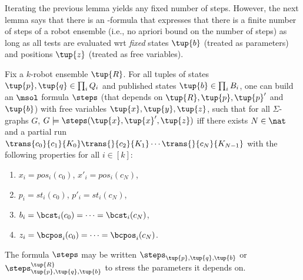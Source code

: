Iterating the previous lemma yields any fixed number of steps. However, the next lemma says that there is an \msol-formula that expresses that there is a finite number of steps of a robot ensemble (i.e., no apriori bound on the number of steps) as long as all tests are evaluated wrt \emph{fixed} states $\tup{b}$ (treated as parameters) and positions $\tup{z}$ (treated as free variables).



\begin{lemma} \label{lem:steps}
Fix a $k$-robot ensemble $\tup{R}$. For all tuples of states $\tup{p},\tup{q} \in \prod_i Q_i$ and published states $\tup{b} \in \prod_i B_i$,
one can build an $\msol$ formula $\steps$ (that depends on $\tup{R},\tup{p},\tup{p}'$ and $\tup{b}$) with free variables 
$\tup{x}, \tup{y}, \tup{z}$, such that 
for all $\Sigma$-graphs $G$, $G \models \steps(\tup{x}, \tup{x}', \tup{z})$ iff there exists $N \in \nat$ and a partial run  
$\trans{c_0}{c_1}{K_0}\trans{}{c_2}{K_1} \cdots \trans{}{c_N}{K_{N-1}}$ with the following properties for all $i \in [k]$:
\begin{enumerate}
 \item $x_i = pos_i(c_0)$, $x'_i = pos_i(c_N)$,
 \item $p_i = st_i(c_0)$, $p'_i = st_i(c_N)$,
 \item $b_i = \bcst_i(c_0) = \dots = \bcst_i(c_N)$,
 \item $z_i = \bcpos_i(c_0) = \dots = \bcpos_i(c_N)$.
 \end{enumerate}
The formula $\steps$ may be written $\steps_{\tup{p},\tup{q},\tup{b}}$ or $\steps^{\tup{R}}_{\tup{p},\tup{q},\tup{b}}$ to stress the parameters it depends on.
\end{lemma}

